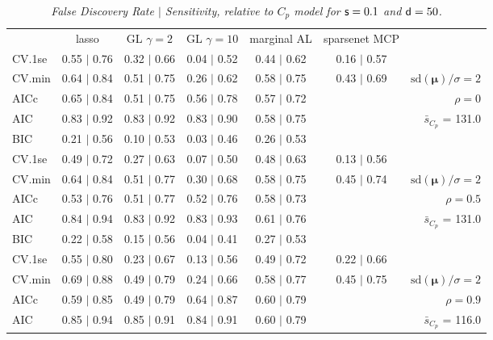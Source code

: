 \documentclass[12pt]{article}
\newcommand{\mr}[1]{\mathrm{#1}}
\newcommand{\bm}[1]{\mathbf{#1}}
\begin{document}
\begin{table}[p]\vspace{-.5cm}
\caption[l]{\label{sens}\it False Discovery Rate $\mid$ Sensitivity, relative to $C_p$ model  for ${\sf s}=0.1$ and ${\sf d}=50$.}
\vspace{-.5cm}
\small{}
\begin{center}
\begin{tabular}{l*{5}{c}|r}
 & lasso & GL $\gamma=2$ & GL $\gamma=10$ & marginal AL & sparsenet MCP  & \\
 \cline{1-7}
CV.1se & 0.55 $\mid$ 0.76 & 0.32 $\mid$ 0.66 & 0.04 $\mid$ 0.52 & 0.44 $\mid$ 0.62 & 0.16 $\mid$ 0.57 &\\
CV.min & 0.64 $\mid$ 0.84 & 0.51 $\mid$ 0.75 & 0.26 $\mid$ 0.62 & 0.58 $\mid$ 0.75 & 0.43 $\mid$ 0.69 &  $\mr{sd}(\bm{\mu})/\sigma=2$ \\
AICc & 0.65 $\mid$ 0.84 & 0.51 $\mid$ 0.75 & 0.56 $\mid$ 0.78 & 0.57 $\mid$ 0.72 & & $\rho=0$ \\
AIC & 0.83 $\mid$ 0.92 & 0.83 $\mid$ 0.92 & 0.83 $\mid$ 0.90 & 0.58 $\mid$ 0.75 & & \multirow{2}{*}{$\bar{s}_{C_p}$ = 131.0} \\
BIC & 0.21 $\mid$ 0.56 & 0.10 $\mid$ 0.53 & 0.03 $\mid$ 0.46 & 0.26 $\mid$ 0.53 & & \\
 \hline 
CV.1se & 0.49 $\mid$ 0.72 & 0.27 $\mid$ 0.63 & 0.07 $\mid$ 0.50 & 0.48 $\mid$ 0.63 & 0.13 $\mid$ 0.56 &\\
CV.min & 0.64 $\mid$ 0.84 & 0.51 $\mid$ 0.77 & 0.30 $\mid$ 0.68 & 0.58 $\mid$ 0.75 & 0.45 $\mid$ 0.74 &  $\mr{sd}(\bm{\mu})/\sigma=2$ \\
AICc & 0.53 $\mid$ 0.76 & 0.51 $\mid$ 0.77 & 0.52 $\mid$ 0.76 & 0.58 $\mid$ 0.73 & & $\rho=0.5$ \\
AIC & 0.84 $\mid$ 0.94 & 0.83 $\mid$ 0.92 & 0.83 $\mid$ 0.93 & 0.61 $\mid$ 0.76 & & \multirow{2}{*}{$\bar{s}_{C_p}$ = 131.0} \\
BIC & 0.22 $\mid$ 0.58 & 0.15 $\mid$ 0.56 & 0.04 $\mid$ 0.41 & 0.27 $\mid$ 0.53 & & \\
 \hline 
CV.1se & 0.55 $\mid$ 0.80 & 0.23 $\mid$ 0.67 & 0.13 $\mid$ 0.56 & 0.49 $\mid$ 0.72 & 0.22 $\mid$ 0.66 &\\
CV.min & 0.69 $\mid$ 0.88 & 0.49 $\mid$ 0.79 & 0.24 $\mid$ 0.66 & 0.58 $\mid$ 0.77 & 0.45 $\mid$ 0.75 &  $\mr{sd}(\bm{\mu})/\sigma=2$ \\
AICc & 0.59 $\mid$ 0.85 & 0.49 $\mid$ 0.79 & 0.64 $\mid$ 0.87 & 0.60 $\mid$ 0.79 & & $\rho=0.9$ \\
AIC & 0.85 $\mid$ 0.94 & 0.85 $\mid$ 0.91 & 0.84 $\mid$ 0.91 & 0.60 $\mid$ 0.79 & & \multirow{2}{*}{$\bar{s}_{C_p}$ = 116.0} \\

\end{tabular}
\end{center}
\end{table}
\end{document}

